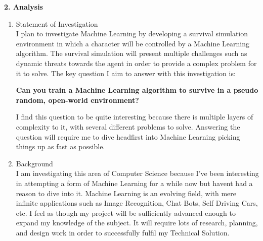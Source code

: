 \begin{flushleft}
    \huge
    \textbf{2. Analysis}
    \vspace{0.1cm}

    \Large
    \begin{enumerate}
        \item {\Large Statement of Investigation} \\
            \large
            \vspace{0.2cm}
            I plan to investigate Machine Learning by developing a survival simulation environment 
            in which a character will be controlled by a Machine Learning algorithm. The survival simulation will 
            present multiple challenges such as dynamic threats towards the agent in order to provide a complex 
            problem for it to solve. The key question I aim to answer with this investigation is:

            \vspace{0.3cm}

            \begin{center}
            \textbf{Can you train a Machine Learning algorithm to survive in a pseudo random, open-world environment?}
            \end{center}

            \vspace{0.3cm}

            I find this question to be quite interesting because there is multiple layers of complexity to it, 
            with several different problems to solve. Answering the question will require me to dive headfirst into 
            Machine Learning picking things up as fast as possible.

        \vspace{1cm}
        \item {\Large Background} \\
            \vspace{0.2cm}
            I am investigating this area of Computer Science because I've been interesting in attempting a form of
            Machine Learning for a while now but havent had a reason to dive into it. Machine Learning is an evolving
            field, with mere infinite applications such as Image Recognition, Chat Bots, Self Driving Cars, 
            etc. I feel as though my project will be sufficiently advanced enough to expand my knowledge of the subject.
            It will require lots of research, planning, and design work in order to successfully fulfil my Technical
            Solution. \\
            \vspace{0.2cm}


\end{enumerate}
\end{flushleft}
